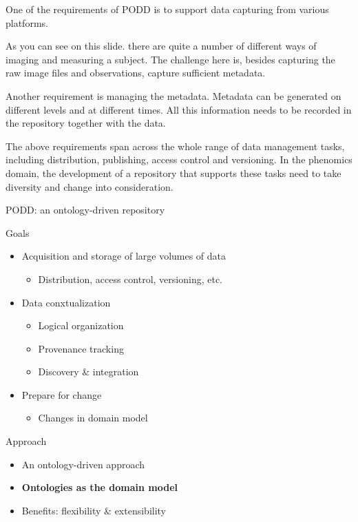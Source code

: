 \documentclass[ignorenonframetext,compress]{beamer}
\begin{document}
One of the requirements of PODD is to support data capturing from
various platforms.

As you can see on this slide. there are quite a number of different
ways of imaging and measuring a subject. The challenge here is,
besides capturing the raw image files and observations, capture
sufficient metadata.

Another requirement is managing the metadata. Metadata can be
generated on different levels and at different times. All this
information needs to be recorded in the repository together with
the data.

The above requirements span across the whole range of data management
tasks, including distribution, publishing, access control and versioning. 
In the phenomics domain, the development of a repository that supports 
these tasks need to take diversity and change into consideration.

\begin{frame}{PODD: an ontology-driven repository}
\begin{block}{Goals}
    \begin{itemize}
        \item Acquisition and storage of large volumes of data
        \begin{itemize}
        	\item Distribution, access control, versioning, etc.
	    \end{itemize}
        \item Data conxtualization
        \begin{itemize}
			\item Logical organization
        	\item Provenance tracking
			\item Discovery \& integration
        \end{itemize}
        \item Prepare for change
        \begin{itemize}
        	\item Changes in domain model
        \end{itemize}
    \end{itemize}
\end{block}
\pause
\begin{block}{Approach}
    \begin{itemize}
        \item An ontology-driven approach
        \item \textbf{Ontologies as the domain model}
        \item Benefits: flexibility \& extensibility
    \end{itemize}
\end{block}
\end{frame}
\end{document}
